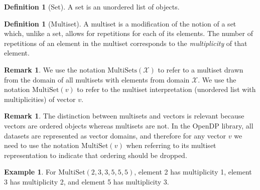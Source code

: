 \documentclass[11pt,a4paper]{article}
\theoremstyle{definition}
\newtheorem{remark}[theorem]{Remark}
\newtheorem{definition}[theorem]{Definition}
\newtheorem{example}[theorem]{Example}
\newcommand{\MultiSet}{\mathrm{MultiSet}}
\newcommand{\MultiSets}{\mathrm{MultiSets}}
\newcommand{\todo}{{\textcolor{red}{TODO }}}
\begin{document}
\begin{definition}[Set]
A set is an unordered list of objects.
\end{definition}

\begin{definition}[Multiset]
A multiset is a modification of the notion of a set which, unlike a set, allows for repetitions for each of its elements. The number of repetitions of an element in the multiset corresponds to the \textit{multiplicity} of that element.
\end{definition}

\begin{remark}
    We use the notation $\MultiSets(\mathcal{X})$ to refer to a multiset drawn from the domain of all multisets with elements from domain $\mathcal{X}$. We use the notation $\MultiSet(v)$ to refer to the multiset interpretation (unordered list with multiplicities) of vector $v$.
\end{remark}

\begin{remark}
The distinction between multisets and vectors is relevant because vectors are ordered objects whereas multisets are not. In the OpenDP library, all datasets are represented as vector domains, and therefore for any vector $v$ we need to use the notation $\MultiSet(v)$ when referring to its multiset representation to indicate that ordering should be dropped. 
\end{remark}

\begin{example}
    For $\MultiSet(2, 3, 3, 5, 5, 5 )$, element 2 has multiplicity 1, element 3 has multiplicity 2, and element 5 has multiplicity 3.
\end{example}

\iffalse
\begin{definition}[Histogram notation, multiset version]
\label{defn:histogram}
    Let $h_x: \mathcal{X} \rightarrow \mathbb{N}$ be the histogram of a multiset $x \in \MultiSet(\mathcal{X} )$ for some domain $\mathcal{X}$. That is, $h_x(z)$ denotes the number of occurrences of $z \in \mathcal{X}$ in multiset $x$ (with multiplicities).
\end{definition}


\begin{definition}[Histogram notation, vector version]
    For any vector $v$ of elements of a domain \texttt{D}, $h_v$ denotes the histogram of $v$. That is, for every element $z$ of type \texttt{T}, $h_v(z)$ denotes the number of occurrences of $z \in \texttt{D}$ in the entries of vector $v$ (with multiplicities).
\end{definition}
\fi
\end{document}
